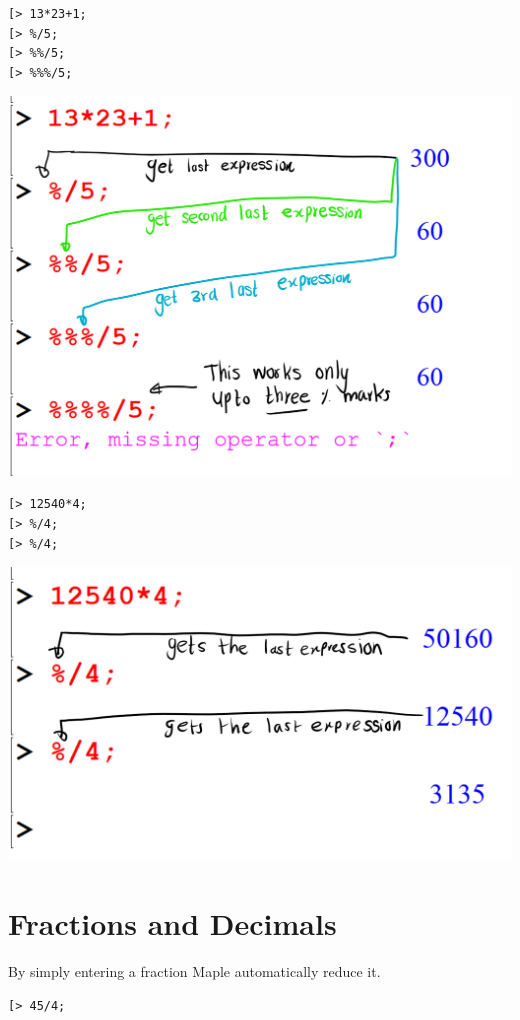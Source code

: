 \documentclass[
]{book}
\theoremstyle{definition}
\theoremstyle{definition}
\theoremstyle{definition}
\theoremstyle{definition}
\theoremstyle{remark}
\begin{document}
\begin{verbatim}
[> 13*23+1;
[> %/5;
[> %%/5;
[> %%%/5;
\end{verbatim}

\includegraphics{figures/Lesson 1/fig17.png}

\begin{verbatim}
[> 12540*4;
[> %/4;
[> %/4;
\end{verbatim}

\includegraphics{figures/Lesson 1/fig18.png}

\section{Fractions and Decimals}\label{fractions-and-decimals-1}

By simply entering a fraction Maple automatically reduce it.

\begin{verbatim}
[> 45/4;
\end{verbatim}
\end{document}
